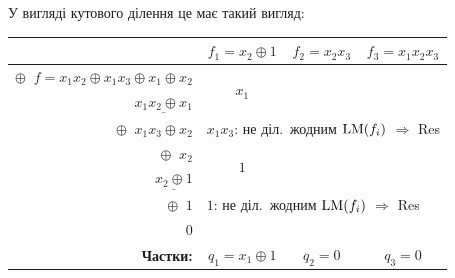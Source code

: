 У вигляді кутового ділення це має такий вигляд:
\begin{center}
    \renewcommand{\arraystretch}{1.6}
    \setlength{\tabcolsep}{10pt}
    \begin{tabular}{r|c|c|c}
                                                                        & $f_1 = x_2 \oplus 1$                                                                      & $f_2 = x_2 x_3$ & $f_3 = x_1 x_2 x_3$ \\[2pt]
        \hline
        \rule{0pt}{14pt}
        $\oplus\;\; f = x_1 x_2 \oplus x_1 x_3 \oplus x_1 \oplus x_2$   & \multirow{2}{*}{$x_1$}                                                                    &                 &                     \\
        $\;\;\;\;\underline{x_1 x_2 \oplus x_1}$                        &                                                                                           &                 &                     \\[2pt]
        \hline
        \rule{0pt}{14pt}
        $\oplus\;\; x_1 x_3 \oplus x_2$                                 & \multicolumn{3}{l}{\footnotesize $x_1 x_3$: не діл.\ жодним $\mathrm{LM}(f_i)$ $\Rightarrow$ Res}                                         \\[2pt]
        \hline
        \rule{0pt}{14pt}
        $\oplus\;\; x_2$                                                & \multirow{2}{*}{$1$}                                                                      &                 &                     \\
        $\;\;\;\;\underline{x_2 \oplus 1}$                              &                                                                                           &                 &                     \\[2pt]
        \hline
        \rule{0pt}{14pt}
        $\oplus\;\; 1$                                                  & \multicolumn{3}{l}{\footnotesize $1$: не діл.\ жодним $\mathrm{LM}(f_i)$ $\Rightarrow$ Res}                                               \\[2pt]
        \hline
        $0$                                                             &                                                                                           &                 &                     \\[2pt]
        \hline\hline
        \rule{0pt}{14pt}
        \textbf{Частки:}                                                & $q_1 = x_1 \oplus 1$                                                                      & $q_2 = 0$       & $q_3 = 0$           \\
    \end{tabular}
\end{center}

